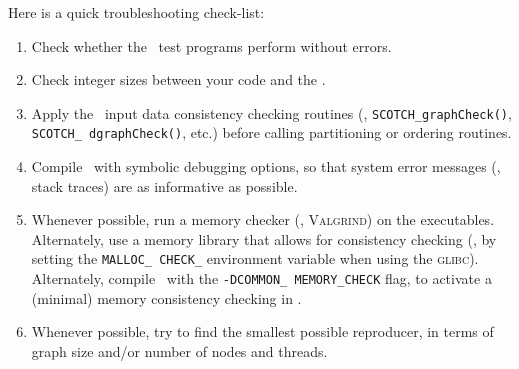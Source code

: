 Here is a quick troubleshooting check-list:
\begin{enumerate}
\item
Check whether the \scotch\ test programs perform without errors.
\item
Check integer sizes between your code and the \libscotch.
\item
Apply the \scotch\ input data consistency checking routines (\eg,
\texttt{SCOTCH\_\lbt graph\lbt Check()}, \texttt{SCOTCH\_\lbt
dgraph\lbt Check()}, etc.) before calling partitioning or ordering
routines.
\item
Compile \scotch\ with symbolic debugging options, so that system error
messages (\eg, stack traces) are as informative as possible.
\item
Whenever possible, run a memory checker (\eg, \textsc{Valgrind}) on
the executables. Alternately, use a memory library that allows for
consistency checking (\eg, by setting the \texttt{MALLOC\_\lbt
CHECK\_} environment variable when using the \textsc{glibc}).
Alternately, compile \scotch\ with the \texttt{-DCOMMON\_\lbt
MEMORY\_\lbt CHECK} flag, to activate a (minimal) memory consistency
checking in \scotch.
\item
Whenever possible, try to find the smallest possible reproducer, in
terms of graph size and/or number of nodes and threads.
\end{enumerate}

\begin{center}
\end{center}
